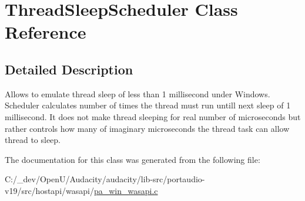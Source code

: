 \hypertarget{class_thread_sleep_scheduler}{}\section{Thread\+Sleep\+Scheduler Class Reference}
\label{class_thread_sleep_scheduler}


\subsection{Detailed Description}
Allows to emulate thread sleep of less than 1 millisecond under Windows. Scheduler calculates number of times the thread must run untill next sleep of 1 millisecond. It does not make thread sleeping for real number of microseconds but rather controls how many of imaginary microseconds the thread task can allow thread to sleep. 

The documentation for this class was generated from the following file\+:\begin{DoxyCompactItemize}
\item 
C\+:/\+\_\+dev/\+Open\+U/\+Audacity/audacity/lib-\/src/portaudio-\/v19/src/hostapi/wasapi/\hyperlink{pa__win__wasapi_8c}{pa\+\_\+win\+\_\+wasapi.\+c}\end{DoxyCompactItemize}

